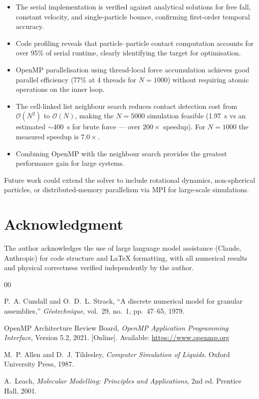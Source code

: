 \documentclass[conference]{IEEEtran}
\begin{document}
	\begin{itemize}
		\item The serial implementation is verified against analytical solutions for
		free fall, constant velocity, and single-particle bounce, confirming
		first-order temporal accuracy.
		
		\item Code profiling reveals that particle--particle contact computation
		accounts for over 95\% of serial runtime, clearly identifying the
		target for optimisation.
		
		\item OpenMP parallelisation using thread-local force accumulation achieves
		good parallel efficiency (77\% at 4 threads for $N=1000$) without
		requiring atomic operations on the inner loop.
		
		\item The cell-linked list neighbour search reduces contact detection cost
		from $\mathcal{O}(N^2)$ to $\mathcal{O}(N)$, making the $N=5000$
		simulation feasible (1.97~s vs an estimated $\sim$400~s for brute
		force — over $200\times$ speedup). For $N=1000$ the measured speedup
		is $7.0\times$.
		
		\item Combining OpenMP with the neighbour search provides the greatest
		performance gain for large systems.
	\end{itemize}
	
	Future work could extend the solver to include rotational dynamics, non-spherical
	particles, or distributed-memory parallelism via MPI for large-scale simulations.
	
	\section*{Acknowledgment}
	The author acknowledges the use of large language model assistance (Claude,
	Anthropic) for code structure and LaTeX formatting, with all numerical results
	and physical correctness verified independently by the author.
	
	\begin{thebibliography}{00}
		
		P.~A. Cundall and O.~D.~L. Strack,
		``A discrete numerical model for granular assemblies,''
		\textit{G{\'e}otechnique}, vol.~29, no.~1, pp.~47--65, 1979.
		
		OpenMP Architecture Review Board,
		\textit{OpenMP Application Programming Interface}, Version 5.2, 2021.
		[Online]. Available: \url{https://www.openmp.org}
		
		M.~P. Allen and D.~J. Tildesley,
		\textit{Computer Simulation of Liquids}.
		Oxford University Press, 1987.
		
		A.~Leach,
		\textit{Molecular Modelling: Principles and Applications}, 2nd ed.
		Prentice Hall, 2001.
		
	\end{thebibliography}
	
\end{document}
